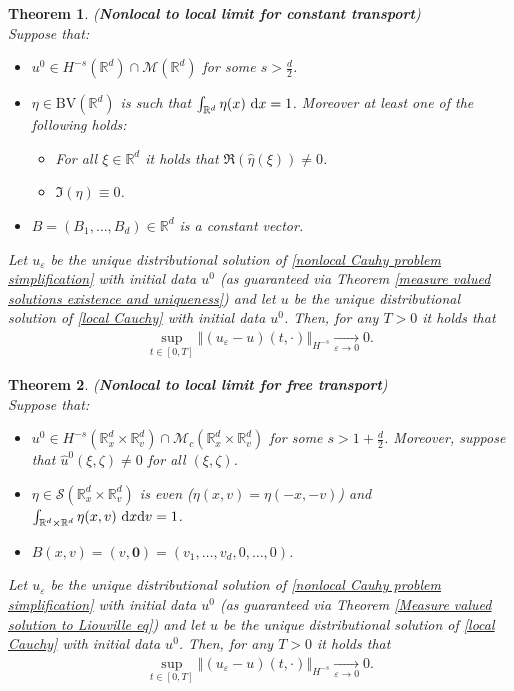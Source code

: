 \documentclass[11pt,reqno]{amsart}
\newtheorem{thm}{Theorem}[section]
\numberwithin{equation}{section}
\def\dd{{\rm d}}
\begin{document}
\begin{thm}\textup{(\textbf{Nonlocal to local limit for constant transport})}
\\ Suppose that: 
\begin{itemize}
    \item $u^{0}\in H^{-s}(\mathbb{R}^{d})\cap \mathcal{M}(\mathbb{R}^{d})$ for some $s>\frac{d}{2}$. 
    \item $\eta\in \mathrm{BV}(\mathbb{R}^{d})$ is such that $\int_{\mathbb{R}^{d}}\eta(x)\ \dd x=1$. Moreover at least one of the following holds:
    \begin{itemize}
        \item     For all $\xi\in \mathbb{R}^{d}$ it holds that $\Re(\widehat{\eta}(\xi))\neq 0$.
        \item $\Im(\eta)\equiv 0$. 
    \end{itemize}
    \item $B=(B_{1},\dots,B_{d})\in \mathbb{R}^{d}$ is a constant vector. 
\end{itemize}
Let $u_{\varepsilon}$ be the unique distributional  solution of \eqref{nonlocal Cauhy problem simplification} with initial data $u^{0}$ (as guaranteed via Theorem \ref{measure valued solutions existence and uniqueness}) and let $u$ be the unique distributional solution of \eqref{local Cauchy} with initial data $u^{0}$. Then, for any $T>0$ it holds that 
\begin{align*}
\underset{t\in [0,T]}{\sup}\left\Vert (u_{\varepsilon}-u)(t,\cdot)\right\Vert_{H^{-s}}\underset{\varepsilon \rightarrow 0}{\rightarrow} 0.    
\end{align*}
\label{Constant transport limit}
\end{thm}
\begin{thm}\textup{(\textbf{Nonlocal to local limit for free transport})}\\
Suppose that: 
\begin{itemize}
    \item $u^{0}\in H^{-s}(\mathbb{R}^{d}_{x}\times \mathbb{R}^{d}_{v})\cap \mathcal{M}_{c}(\mathbb{R}^{d}_{x}\times \mathbb{R}^{d}_{v})$ for some $s>1+\frac{d}{2}$. Moreover, suppose that $\widehat{u}^{0}(\xi,\zeta)\neq 0$ for all $(\xi,\zeta)$. 
    \item $\eta\in \mathcal{S}(\mathbb{R}^{d}_{x}\times \mathbb{R}^{d}_{v})$ is even \textup{(}$\eta(x,v)=\eta(-x,-v
    )$\textup{)} and $\int_{\mathbb{R}^{d}\times \mathbb{R}^{d}}\eta(x,v)\ \dd x\dd v=1$. 
    \item $B(x,v)=(v,\mathbf{0})=(v_{1},\dots,v_{d},0,\dots,0)$. 
\end{itemize}
Let $u_{\varepsilon}$ be the unique distributional solution of \eqref{nonlocal Cauhy problem simplification} with initial data $u^{0}$ (as guaranteed via Theorem \ref{Measure valued solution to Liouville eq}) and let $u$ be the unique distributional solution of \eqref{local Cauchy} with initial data $u^{0}$. Then, for any $T>0$ it holds that 
\begin{align*}
\underset{t\in [0,T]}{\sup}\left\Vert (u_{\varepsilon}-u)(t,\cdot)\right\Vert_{H^{-s}}\underset{\varepsilon \rightarrow 0}{\rightarrow} 0.   
\end{align*}
\label{Free transport limit}
\end{thm}
\end{document}
